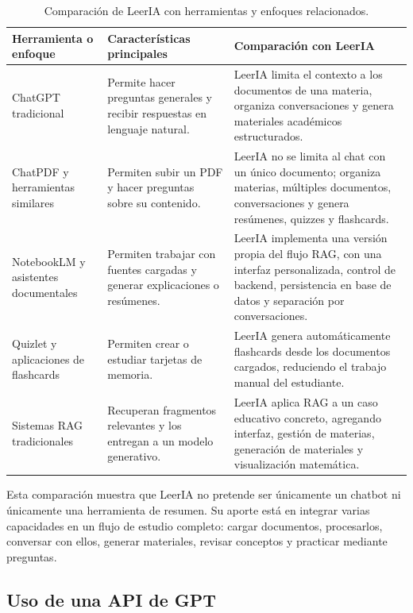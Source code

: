 \documentclass[12pt, letterpaper]{article}
\begin{document}
	\begin{table}[H]
		\centering
		\renewcommand{\arraystretch}{1.3}
		\begin{tabular}{p{3.2cm} p{5.2cm} p{6cm}}
			\toprule
			\textbf{Herramienta o enfoque} & \textbf{Características principales} & \textbf{Comparación con LeerIA} \\
			\midrule
			ChatGPT tradicional & Permite hacer preguntas generales y recibir respuestas en lenguaje natural. & LeerIA limita el contexto a los documentos de una materia, organiza conversaciones y genera materiales académicos estructurados. \\
			\midrule
			ChatPDF y herramientas similares & Permiten subir un PDF y hacer preguntas sobre su contenido. & LeerIA no se limita al chat con un único documento; organiza materias, múltiples documentos, conversaciones y genera resúmenes, quizzes y flashcards. \\
			\midrule
			NotebookLM y asistentes documentales & Permiten trabajar con fuentes cargadas y generar explicaciones o resúmenes. & LeerIA implementa una versión propia del flujo RAG, con una interfaz personalizada, control de backend, persistencia en base de datos y separación por conversaciones. \\
			\midrule
			Quizlet y aplicaciones de flashcards & Permiten crear o estudiar tarjetas de memoria. & LeerIA genera automáticamente flashcards desde los documentos cargados, reduciendo el trabajo manual del estudiante. \\
			\midrule
			Sistemas RAG tradicionales & Recuperan fragmentos relevantes y los entregan a un modelo generativo. & LeerIA aplica RAG a un caso educativo concreto, agregando interfaz, gestión de materias, generación de materiales y visualización matemática. \\
			\bottomrule
		\end{tabular}
		\caption{Comparación de LeerIA con herramientas y enfoques relacionados.}
	\end{table}
	
	Esta comparación muestra que LeerIA no pretende ser únicamente un chatbot ni únicamente una herramienta de resumen. Su aporte está en integrar varias capacidades en un flujo de estudio completo: cargar documentos, procesarlos, conversar con ellos, generar materiales, revisar conceptos y practicar mediante preguntas.
	
	\subsection{Uso de una API de GPT}
	
\end{document}
